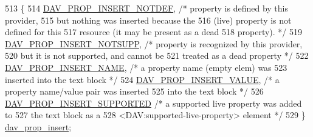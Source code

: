 \begin{DoxyCode}
513              \{
514     \hyperlink{group__MOD__DAV_gga4c0cd73bce52d0eda981ce54973f27afad6c4707dbee26a2512e29fe1aac31e34}{DAV\_PROP\_INSERT\_NOTDEF},     \textcolor{comment}{/* property is defined by this provider,}
515 \textcolor{comment}{                                   but nothing was inserted because the}
516 \textcolor{comment}{                                   (live) property is not defined for this}
517 \textcolor{comment}{                                   resource (it may be present as a dead}
518 \textcolor{comment}{                                   property). */}
519     \hyperlink{group__MOD__DAV_gga4c0cd73bce52d0eda981ce54973f27afae4995228c2489d111aae3f29f473eee0}{DAV\_PROP\_INSERT\_NOTSUPP},    \textcolor{comment}{/* property is recognized by this provider,}
520 \textcolor{comment}{                                   but it is not supported, and cannot be}
521 \textcolor{comment}{                                   treated as a dead property */}
522     \hyperlink{group__MOD__DAV_gga4c0cd73bce52d0eda981ce54973f27afa331df26b3f9729a36058dd7cf56b0267}{DAV\_PROP\_INSERT\_NAME},       \textcolor{comment}{/* a property name (empty elem) was}
523 \textcolor{comment}{                                   inserted into the text block */}
524     \hyperlink{group__MOD__DAV_gga4c0cd73bce52d0eda981ce54973f27afaac24aa1113cbab49a3fbc47398293d8f}{DAV\_PROP\_INSERT\_VALUE},      \textcolor{comment}{/* a property name/value pair was inserted}
525 \textcolor{comment}{                                   into the text block */}
526     \hyperlink{group__MOD__DAV_gga4c0cd73bce52d0eda981ce54973f27afaf615c37a063c2d90eac2dad9e07438e3}{DAV\_PROP\_INSERT\_SUPPORTED}   \textcolor{comment}{/* a supported live property was added to}
527 \textcolor{comment}{                                   the text block as a}
528 \textcolor{comment}{                                   <DAV:supported-live-property> element */}
529 \} \hyperlink{group__MOD__DAV_ga4c0cd73bce52d0eda981ce54973f27af}{dav\_prop\_insert};
\end{DoxyCode}
